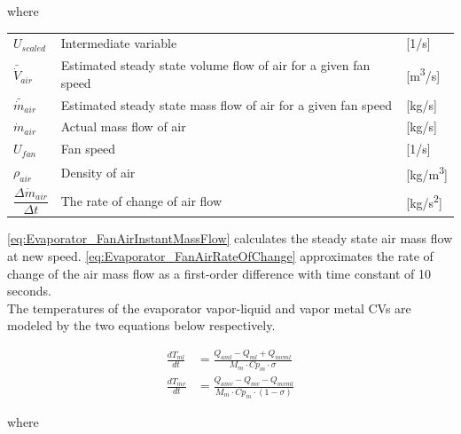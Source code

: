 where

\begin{center}
	\begin{tabular}{l p{8cm} l}
		$ U_{scaled} $ 								& Intermediate variable												& [1/\si{s}]\\
		$\bar{\dot{V}}_{air}$						& Estimated steady state volume flow of air for a given fan speed 	& [\si{m^3}/\si{s}] \\
		$\bar{\dot{m}}_{air}$						& Estimated steady state mass flow of air for a given fan speed 	& [\si{kg}/\si{s}] \\
		$\dot{m}_{air}$								& Actual mass flow of air					  						& [\si{kg}/\si{s}] \\
		$U_{fan}$									& Fan speed 														& [1/\si{s}] \\
		$\rho_{air}$								& Density of air													& [\si{kg}/\si{m^3}] \\[0.2cm]
		$\dfrac{\Delta \dot{m}_{air}}{\Delta t} $ 	& The rate of change of	air flow 									& [\si{kg}/\si{s^2}]
	\end{tabular}
\end{center}

\cref{eq:Evaporator_FanAirInstantMassFlow} calculates the steady state air mass flow at new speed. \cref{eq:Evaporator_FanAirRateOfChange} approximates the rate of change of the air mass flow as a first-order difference with time constant of 10 seconds. \\

The temperatures of the evaporator vapor-liquid and vapor metal CVs are modeled by the two equations below respectively.

\begin{align}
	\frac{dT_{ml}}{dt} & = \frac{Q_{aml}-Q_{ml} + Q_{mvml}}{M_m \cdot Cp_m \cdot \sigma}        \\
	\frac{dT_{mv}}{dt} & = \frac{Q_{amv} - Q_{mv} - Q_{mvml}}{M_m \cdot Cp_m \cdot (1- \sigma)}
\end{align}

where

